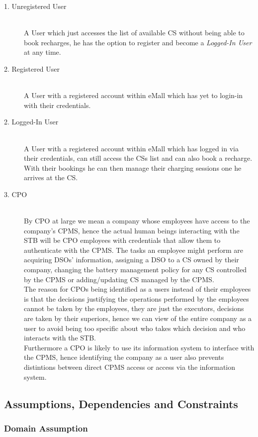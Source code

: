 \documentclass[11pt]{article}
\begin{document}
\begin{description}
    \item [1. Unregistered User] \hfill \\
        A User which just accesses the list of available CS without being able to book recharges, he has the option to register and become a \textit{Logged-In User} at any time.
    \item [2. Registered User] \hfill \\
        A User with a registered account within eMall which has yet to login-in with their credentials.
    \item [2. Logged-In User] \hfill \\
        A User with a registered account within eMall which has logged in via their credentials, can still access the CSs list and can also book a recharge. With their bookings he can then manage their charging sessions one he arrives at the CS.
    \item [3. CPO] \hfill \\
        By CPO at large we mean a company whose employees have access to the company's CPMS, hence the actual human beings interacting with the STB will be CPO employees with credentials that allow them to authenticate with the CPMS. The tasks an employee might perform are acquiring DSOs' information, assigning a DSO to a CS owned by their company, changing the battery management policy for any CS controlled by the CPMS or adding/updating CS managed by the CPMS. \\
        The reason for CPOs being identified as a users instead of their employees is that the decisions justifying the operations performed by the employees cannot be taken by the employees, they are just the executors, decisions are taken by their superiors, hence we can view of the entire company as a user to avoid being too specific about who takes which decision and who interacts with the STB. \\
        Furthermore a CPO is likely to use its information system to interface with the CPMS, hence identifying the company as a user also prevents distintions between direct CPMS access or access via the information system.
\end{description}

\subsection{Assumptions, Dependencies and Constraints}

\subsubsection{Domain Assumption}
\end{document}
